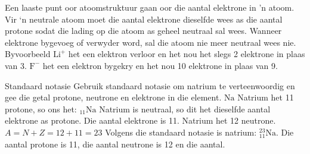 
\label{m38745*eip-950} 
      \noindent 
Een laaste punt oor atoomstruktuur gaan oor die aantal elektrone in 'n atoom. Vir ‘n neutrale atoom moet die aantal elektrone dieselfde wees as die aantal protone sodat die lading op die atoom as geheel neutraal sal wees. Wanneer elektrone bygevoeg of verwyder word, sal die atoom nie meer neutraal wees nie. Byvoorbeeld $\text{Li}^{+}$ het een elektron verloor en het nou het slegs 2 elektrone in plaas van 3. $\text{F}^{-}$ het een elektron bygekry en het nou 10 elektrone in plaas van 9.   
\begin{wex}
{%
Standaard notasie
}
{%
Gebruik standaard notasie om natrium te verteenwoordig en gee die getal protone, neutrone en elektrone in die element.
}
{%
 $\text{Na}$
 Natrium het 11 protone, so ons het: ${}_{11}\text{Na}$
 Natrium is neutraal, so dit het dieselfde aantal elektrone as protone. Die aantal elektrone is 11.
 Natrium het 12 neutrone.
 $A=N+Z=12+11=23$
 Volgens die standaard notasie is natrium: $_{11}^{23}\text{Na}$. Die aantal protone is 11, die aantal neutrone is 12 en die aantal.
}    
\end{wex}
    

